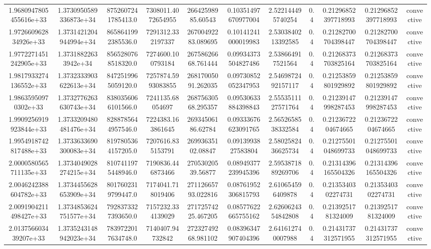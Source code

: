 \begin{table}
\begin{tabular}{ccccccccccc}
1.9680947805455616e+33 & 1.3730950589336873e+34 & 8752607241785413.0 & 7308011.4072654955 & 26642598985.60543 & 0.10351497670977004 & 2.522144495740254 & 0.4 & 0.21296852397718993 & 0.21296852397718993 & convective \\
1.972660962834926e+33 & 1.3731421204944994e+34 & 8658641992385536.0 & 7291312.332197337 & 26700492283.089695 & 0.10141241000019983 & 2.5303840213392585 & 0.4 & 0.21282700704398447 & 0.21282700704398447 & convective \\
1.9772271451242905e+33 & 1.37318822633942e+34 & 8565280768518320.0 & 7274600.100793184 & 26758626668.761444 & 0.09934373504827486 & 2.538664917521564 & 0.4 & 0.21268373703825164 & 0.21268373703825164 & convective \\
1.9817933274136552e+33 & 1.3732333903622613e+34 & 8472519965059120.0 & 7257874.5993083855 & 26817005091.262035 & 0.09730852052347953 & 2.5469872492157117 & 0.4 & 0.21253859801929892 & 0.21253859801929892 & convective \\
1.98635950970302e+33 & 1.3732776263630743e+34 & 8380356066101566.0 & 7241135.68054697 & 26875630568.295357 & 0.09530633884398843 & 2.5553511127571764 & 0.4 & 0.21239147998287453 & 0.21239147998287453 & convective \\
1.9909256919923844e+33 & 1.3733209480481476e+34 & 8288785644957546.0 & 7224383.163861645 & 26934506186.62784 & 0.09333676623091765 & 2.5652658538332584 & 0.4 & 0.2123672204674665 & 0.2123672204674665 & convective \\
1.9954918742817488e+33 & 1.3733633690300083e+34 & 8197805364157205.0 & 7207616.835153791 & 26993635102.08847 & 0.0913993827583804 & 2.5802582436625734 & 0.4 & 0.21275501048699733 & 0.21275501048699733 & convective \\
2.0000580565711135e+33 & 1.3734049028274215e+34 & 8107411975448946.0 & 7190836.446873466 & 27053020539.56877 & 0.08949377239945396 & 2.5953871889269706 & 0.4 & 0.21314396165504326 & 0.21314396165504326 & convective \\
2.0046242388604782e+33 & 1.3734455628653909e+34 & 8017602319799447.0 & 7174041.718019406 & 27112665793.022816 & 0.08761952306815793 & 2.610654596409878 & 0.4 & 0.2135340302274731 & 0.2135340302274731 & convective \\
2.0091904211498427e+33 & 1.3734853624751577e+34 & 7928373327393650.0 & 7157232.334139029 & 27172574225.467205 & 0.08577622665755162 & 2.6260624354842808 & 0.4 & 0.2139251781324009 & 0.2139251781324009 & convective \\
2.013756603439207e+33 & 1.3735243148942023e+34 & 7839722017634748.0 & 7140407.94732842 & 27232749268.981102 & 0.08396347907404396 & 2.641612740007988 & 0.4 & 0.21431737312571955 & 0.21431737312571955 & convective \\

\end{tabular}
\end{table}
